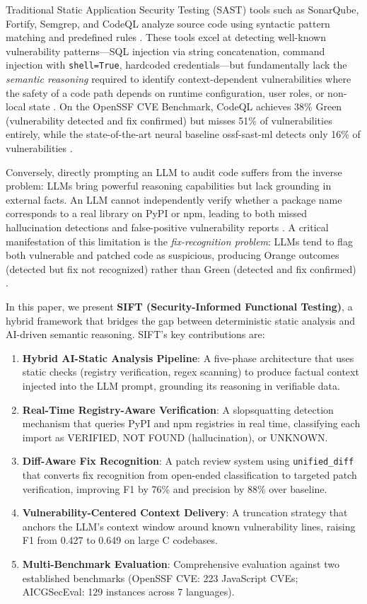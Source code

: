 \documentclass[conference]{IEEEtran}
\begin{document}
Traditional Static Application Security Testing (SAST) tools such as SonarQube, Fortify, Semgrep, and CodeQL analyze source code using syntactic pattern matching and predefined rules \cite{b3}. These tools excel at detecting well-known vulnerability patterns---SQL injection via string concatenation, command injection with \texttt{shell=True}, hardcoded credentials---but fundamentally lack the \textit{semantic reasoning} required to identify context-dependent vulnerabilities where the safety of a code path depends on runtime configuration, user roles, or non-local state \cite{b4}. On the OpenSSF CVE Benchmark, CodeQL achieves 38\% Green (vulnerability detected and fix confirmed) but misses 51\% of vulnerabilities entirely, while the state-of-the-art neural baseline ossf-sast-ml detects only 16\% of vulnerabilities \cite{b5}.

Conversely, directly prompting an LLM to audit code suffers from the inverse problem: LLMs bring powerful reasoning capabilities but lack grounding in external facts. An LLM cannot independently verify whether a package name corresponds to a real library on PyPI or npm, leading to both missed hallucination detections and false-positive vulnerability reports \cite{b6}. A critical manifestation of this limitation is the \textit{fix-recognition problem}: LLMs tend to flag both vulnerable and patched code as suspicious, producing Orange outcomes (detected but fix not recognized) rather than Green (detected and fix confirmed) \cite{b7}.

In this paper, we present \textbf{SIFT (Security-Informed Functional Testing)}, a hybrid framework that bridges the gap between deterministic static analysis and AI-driven semantic reasoning. SIFT's key contributions are:

\begin{enumerate}
\item \textbf{Hybrid AI-Static Analysis Pipeline}: A five-phase architecture that uses static checks (registry verification, regex scanning) to produce factual context injected into the LLM prompt, grounding its reasoning in verifiable data.
\item \textbf{Real-Time Registry-Aware Verification}: A slopsquatting detection mechanism that queries PyPI and npm registries in real time, classifying each import as VERIFIED, NOT FOUND (hallucination), or UNKNOWN.
\item \textbf{Diff-Aware Fix Recognition}: A patch review system using \texttt{unified\_diff} that converts fix recognition from open-ended classification to targeted patch verification, improving F1 by 76\% and precision by 88\% over baseline.
\item \textbf{Vulnerability-Centered Context Delivery}: A truncation strategy that anchors the LLM's context window around known vulnerability lines, raising F1 from 0.427 to 0.649 on large C codebases.
\item \textbf{Multi-Benchmark Evaluation}: Comprehensive evaluation against two established benchmarks (OpenSSF CVE: 223 JavaScript CVEs; AICGSecEval: 129 instances across 7 languages).
\end{enumerate}
\end{document}
